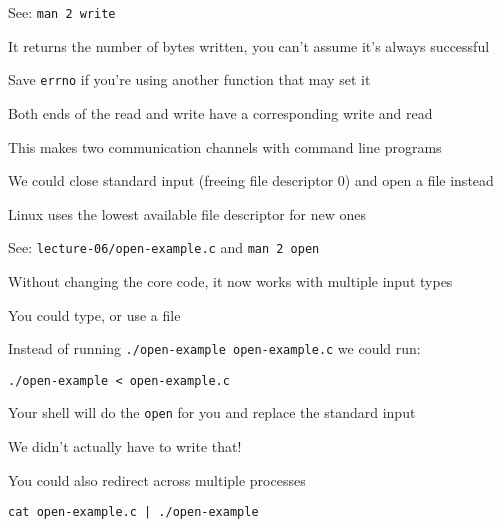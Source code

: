  \begin{slide}


    See: \texttt{man 2 write}
    \medskip

    It returns the number of bytes written, you can't assume it's always
    successful

    \leftspace{}Save \texttt{errno} if you're using another function that may
                  set it
    \medskip

    Both ends of the read and write have a corresponding write and read

    \leftspace{}This makes two communication channels with command line programs

  \end{slide}

  \begin{slide}


    We could close standard input (freeing file descriptor 0) and open a file
    instead

    \leftspace{}Linux uses the lowest available file descriptor for new ones
    \medskip

    See: \texttt{lecture-06/open-example.c} and \texttt{man 2 open}
    \medskip

    Without changing the core code, it now works with multiple input types

    \leftspace{}You could type, or use a file

  \end{slide}

  \begin{slide}


    Instead of running \texttt{./open-example open-example.c} we could run:

    \leftspace{}\texttt{./open-example < open-example.c}
    \medskip

    Your shell will do the \texttt{open} for you and replace the standard input

    \leftspace{}We didn't actually have to write that!
    \medskip

    You could also redirect across multiple processes

    \leftspace{}\texttt{cat open-example.c | ./open-example} 

  \end{slide}

